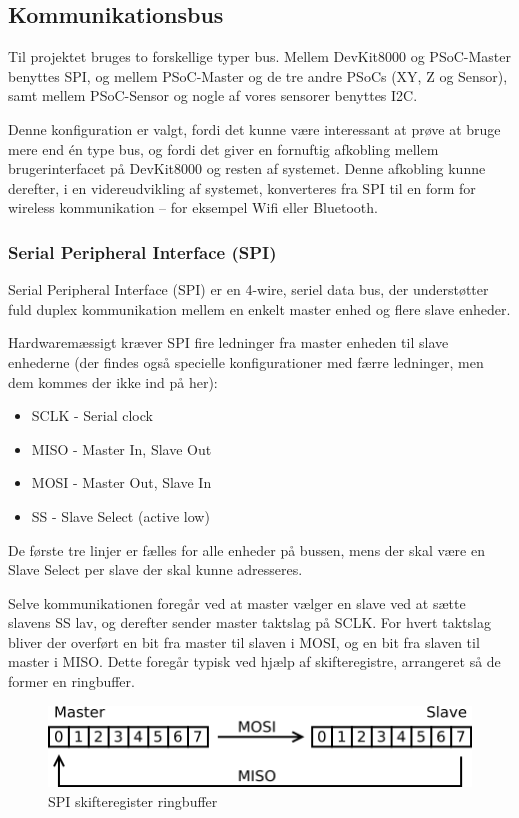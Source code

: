 \subsection{Kommunikationsbus}

Til projektet bruges to forskellige typer bus. Mellem DevKit8000 og PSoC-Master benyttes SPI, og mellem PSoC-Master og de tre andre PSoCs (XY, Z og Sensor), samt mellem PSoC-Sensor og nogle af vores sensorer benyttes I2C.

Denne konfiguration er valgt, fordi det kunne være interessant at prøve at bruge mere end én type bus, og fordi det giver en fornuftig afkobling mellem brugerinterfacet på DevKit8000 og resten af systemet. Denne afkobling kunne derefter, i en videreudvikling af systemet, konverteres fra SPI til en form for wireless kommunikation – for eksempel Wifi eller Bluetooth.

\subsubsection{Serial Peripheral Interface (SPI)}

Serial Peripheral Interface (SPI) er en 4-wire, seriel data bus, der understøtter fuld duplex kommunikation mellem en enkelt master enhed og flere slave enheder.

Hardwaremæssigt kræver SPI fire ledninger fra master enheden til slave enhederne (der findes også specielle konfigurationer med færre ledninger, men dem kommes der ikke ind på her):

\begin{itemize}
    \item SCLK - Serial clock
    \item MISO - Master In, Slave Out
    \item MOSI - Master Out, Slave In
    \item SS - Slave Select (active low)
\end{itemize}

De første tre linjer er fælles for alle enheder på bussen, mens der skal være en Slave Select per slave der skal kunne adresseres.

Selve kommunikationen foregår ved at master vælger en slave ved at sætte slavens SS lav, og derefter sender master taktslag på SCLK. For hvert taktslag bliver der overført en bit fra master til slaven i MOSI, og en bit fra slaven til master i MISO. Dette foregår typisk ved hjælp af skifteregistre, arrangeret så de former en ringbuffer.

\begin{figure}[H] \centering
    \includegraphics{0_Filer/Figuer/5_HW_Design/SPI_ringbuffer.png}
    \caption{SPI skifteregister ringbuffer}
    \label{fig:HWD_SPI_ring}
\end{figure}

